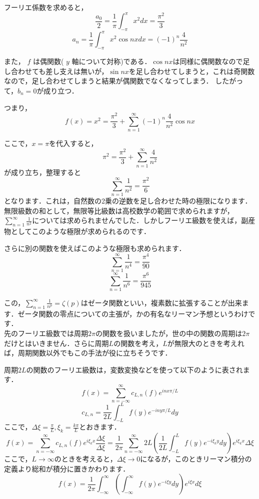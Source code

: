 フーリエ係数を求めると，
\[
  \frac{a_0}{2} = \frac{1}{\pi} \int_{-\pi}^\pi x^2 dx = \frac{\pi^2}{3}
\]
\[
  a_n = \frac{1}{\pi} \int_{-\pi}^\pi x^2 \cos nx dx = (-1)^n \frac{4}{n^2}
\]

また， $f$ は偶関数( $y$ 軸について対称)である．$\cos nx$は同様に偶関数なので足し合わせても差し支えは無いが，$\sin nx$を足し合わせてしまうと，これは奇関数なので，足し合わせてしまうと結果が偶関数でなくなってしまう．
したがって，$b_n = 0$が成り立つ．

つまり，
\[
  f(x) = x^2 = \frac{\pi^2}{3} + \sum_{n=1}^\infty (-1)^n \frac{4}{n^2} \cos nx
\]

ここで，$x = \pi$を代入すると，
\[
  \pi^2 = \frac{\pi^2}{3} + \sum_{n=1}^\infty \frac{4}{n^2}
\]
が成り立ち，整理すると
\[
  \sum_{n=1}^\infty \frac{1}{n^2} = \frac{\pi^2}{6}
\]
となります．これは，自然数の2乗の逆数を足し合わせた時の極限になります．\\

無限級数の和として，無限等比級数は高校数学の範囲で求められますが，$\sum_{n=1}^\infty \frac{1}{n^2}$については求められませんでした．しかしフーリエ級数を使えば，副産物としてこのような極限が求められるのです．

さらに別の関数を使えばこのような極限も求められます．
\[
  \sum_{n=1}^\infty \frac{1}{n^4} = \frac{\pi^4}{90}
\]
\[
  \sum_{n=1}^\infty \frac{1}{n^6} = \frac{\pi^6}{945}
\]

この，$\sum_{n=1}^\infty \frac{1}{n^p} = \zeta(p)$はゼータ関数といい，複素数に拡張することが出来ます．ゼータ関数の零点についての主張が，かの有名なリーマン予想というわけです．\\


先のフーリエ級数では周期$2\pi$の関数を扱いましたが，世の中の関数の周期は$2\pi$だけとはいきません．さらに周期$L$の関数を考え，$L$が無限大のときを考えれば，周期関数以外でもこの手法が役に立ちそうです．

周期$2L$の関数のフーリエ級数は，変数変換などを使って以下のように表されます．
\[
  f(x) = \sum_{n=-\infty}^\infty c_{L,n}(f) e^{inx\pi/L}
\]
\[
  c_{L,n} = \frac{1}{2L} \int_{-L}^L f(y) e^{-iny\pi/L} dy
\]
ここで，$\Delta\xi = \frac{\pi}{L},{\xi_k} = \frac{k\pi}{L}$とおきます．
\[
  f(x) = \sum_{n=-\infty}^\infty c_{L,n}(f) e^{i{\xi_k}x} \frac{\Delta\xi}{\Delta\xi}
  =\frac{1}{2\pi} \sum_{n=-\infty}^\infty 2{L}(\frac{1}{2L} \int_{-L}^L f(y) e^{-i{\xi_k}y} dy) e^{i{\xi_k}x} {\Delta\xi}
\]
ここで，$L \to \infty$のときを考えると，${\Delta\xi} \to 0$になるが，このときリーマン積分の定義より総和が積分に置きかわります．
\[
  f(x) = \frac{1}{2\pi} \int_{-\infty}^\infty (\int_{-\infty}^\infty f(y) e^{-i\xi y}dy) e^{i\xi x}d\xi
\]

